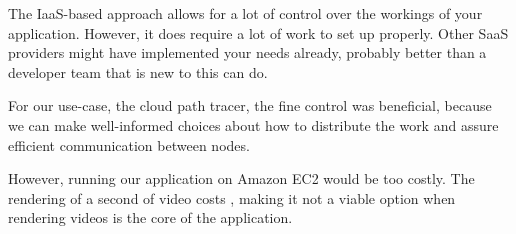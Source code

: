 The IaaS-based approach allows for a lot of control over the workings of your application.
However, it does require a lot of work to set up properly.
Other SaaS providers might have implemented your needs already, probably better than a developer team that is new to this can do.

For our use-case, the cloud path tracer, the fine control was beneficial, because we can make well-informed choices about how to distribute the work and assure efficient communication between nodes.

However, running our application on Amazon EC2 would be too costly.
The rendering of a second of video costs , making it not a viable option when rendering videos is the core of the application.